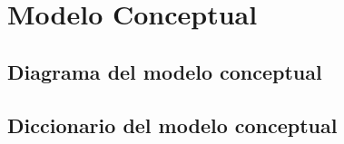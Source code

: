 \chapter{Modelo Conceptual}


\section{Diagrama del modelo conceptual}

\section{Diccionario del modelo conceptual}